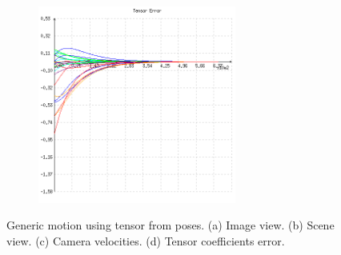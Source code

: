 \begin{figure}[ht!]
\begin{mdframed}[linecolor=black!30,backgroundcolor=black!5]
\begin{subfigure}{.48\linewidth}
    \caption{}
    \label{fig:ex5pvelocity}
  \end{subfigure}
  \begin{subfigure}{.48\linewidth}
    \centering
    \includegraphics[width=65mm]{figures/plots/ex5perror.png}
    \caption{}
    \label{fig:ex5perror}
  \end{subfigure}
  \caption{Generic motion using tensor from poses. (a) Image view. (b) Scene view. (c) Camera velocities. (d) Tensor coefficients error.}
  \label{fig:ex5p}
\end{mdframed}
\end{figure}

